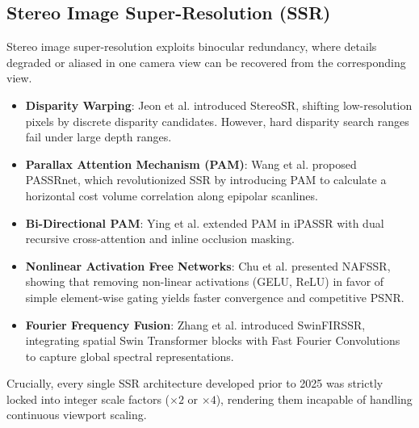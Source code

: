\documentclass[10pt,journal,compsoc]{IEEEtran}
\begin{document}
\subsection{Stereo Image Super-Resolution (SSR)}
Stereo image super-resolution exploits binocular redundancy, where details degraded or aliased in one camera view can be recovered from the corresponding view.
\begin{itemize}
    \item \textbf{Disparity Warping}: Jeon et al. \cite{jeon2018enhancing} introduced StereoSR, shifting low-resolution pixels by discrete disparity candidates. However, hard disparity search ranges fail under large depth ranges.
    \item \textbf{Parallax Attention Mechanism (PAM)}: Wang et al. \cite{wang2019learning} proposed PASSRnet, which revolutionized SSR by introducing PAM to calculate a horizontal cost volume correlation along epipolar scanlines.
    \item \textbf{Bi-Directional PAM}: Ying et al. \cite{ying2020stereo} extended PAM in iPASSR with dual recursive cross-attention and inline occlusion masking.
    \item \textbf{Nonlinear Activation Free Networks}: Chu et al. \cite{chu2022nafssr} presented NAFSSR, showing that removing non-linear activations (GELU, ReLU) in favor of simple element-wise gating yields faster convergence and competitive PSNR.
    \item \textbf{Fourier Frequency Fusion}: Zhang et al. \cite{zhang2023swinfir} introduced SwinFIRSSR, integrating spatial Swin Transformer blocks with Fast Fourier Convolutions to capture global spectral representations.
\end{itemize}
Crucially, every single SSR architecture developed prior to 2025 was strictly locked into integer scale factors ($\times 2$ or $\times 4$), rendering them incapable of handling continuous viewport scaling.
\end{document}

